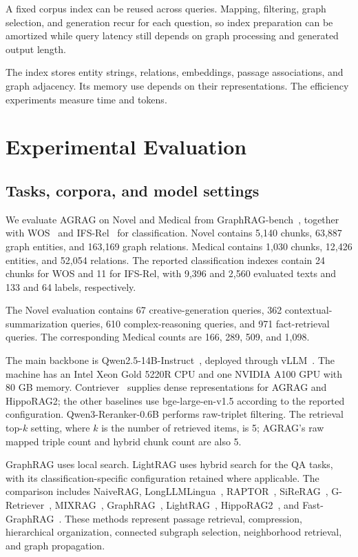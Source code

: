 A fixed corpus index can be reused across queries. Mapping, filtering, graph selection, and generation recur for each question, so index preparation can be amortized while query latency still depends on graph processing and generated output length.

The index stores entity strings, relations, embeddings, passage associations, and graph adjacency. Its memory use depends on their representations. The efficiency experiments measure time and tokens.

\section{Experimental Evaluation}
\label{sec:agrag:experiments}
\subsection{Tasks, corpora, and model settings}
We evaluate AGRAG on Novel and Medical from GraphRAG-bench~\cite{agrag-xiang2025use}, together with WOS~\cite{agrag-kowsari2017hdltex} and IFS-Rel~\cite{agrag-xia-etal-2021-incremental} for classification. Novel contains 5,140 chunks, 63,887 graph entities, and 163,169 graph relations. Medical contains 1,030 chunks, 12,426 entities, and 52,054 relations. The reported classification indexes contain 24 chunks for WOS and 11 for IFS-Rel, with 9,396 and 2,560 evaluated texts and 133 and 64 labels, respectively.

The Novel evaluation contains 67 creative-generation queries, 362 contextual-summarization queries, 610 complex-reasoning queries, and 971 fact-retrieval queries. The corresponding Medical counts are 166, 289, 509, and 1,098.

The main backbone is Qwen2.5-14B-Instruct~\cite{agrag-qwen2025qwen25technicalreport}, deployed through vLLM~\cite{agrag-kwon2023efficient}. The machine has an Intel Xeon Gold 5220R CPU and one NVIDIA A100 GPU with 80 GB memory. Contriever~\cite{agrag-izacardunsupervised} supplies dense representations for AGRAG and HippoRAG2; the other baselines use bge-large-en-v1.5 according to the reported configuration. Qwen3-Reranker-0.6B performs raw-triplet filtering. The retrieval top-$k$ setting, where $k$ is the number of retrieved items, is 5; AGRAG's raw mapped triple count and hybrid chunk count are also 5.

GraphRAG uses local search. LightRAG uses hybrid search for the QA tasks, with its classification-specific configuration retained where applicable. The comparison includes NaiveRAG, LongLLMLingua~\cite{agrag-jiang-etal-2024-longllmlingua}, RAPTOR~\cite{agrag-sarthi2024raptor}, SiReRAG~\cite{agrag-zhang2025sirerag}, G-Retriever~\cite{agrag-he2024g}, MIXRAG~\cite{agrag-liu2025mixrag}, GraphRAG~\cite{agrag-edge2024local}, LightRAG~\cite{agrag-guo2024lightrag}, HippoRAG2~\cite{agrag-gutiérrez2025ragmemory}, and Fast-GraphRAG~\cite{agrag-fastgraphrag}. These methods represent passage retrieval, compression, hierarchical organization, connected subgraph selection, neighborhood retrieval, and graph propagation.

